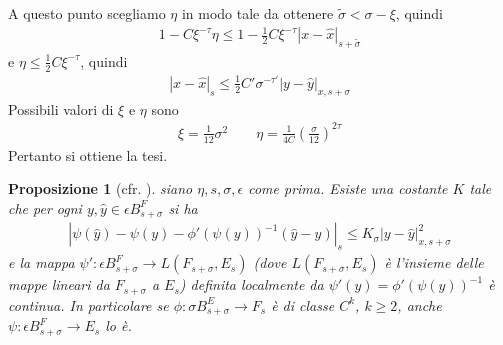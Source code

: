 \documentclass[twoside, 11pt]{amsbook}
\makeatletter
\newcommand{\0}{{(0)}}
\newcommand{\3}{{(3)}}
\theoremstyle{colonplain}
\newtheorem{prop}[thm]{Proposizione}
\theoremstyle{colondefinition}
\theoremstyle{colonremark}
\numberwithin{equation}{chapter}
\renewcommand{\proofname}{Dimostrazione}
\renewenvironment{proof}[1][\proofname]{\par
  \pushQED{\qed}%
  \normalfont \topsep6\p@\@plus6\p@\relax
  \trivlist
  \item[\hskip\labelsep\bfseries #1:]\ignorespaces
}{%
  \popQED\endtrivlist\@endpefalse
}
\makeatother
\begin{document}
\begin{proof}
A questo punto scegliamo $\eta$ in modo tale da ottenere $\widetilde{\sigma} < \sigma - \xi$, quindi
\begin{align}
    1 - C\xi^{-\tau}\eta \leq 1 - \frac{1}{2}C\xi^{-\tau}|x - \hat{x}|_{s + \widetilde{\sigma}}
\end{align}
e $\eta \leq \frac{1}{2}C\xi^{-\tau}$, quindi
\begin{align}
    |x - \hat{x}|_s \leq \frac{1}{2}C'\sigma^{-\tau'}|y - \hat{y}|_{x, s + \sigma}
\end{align}
Possibili valori di $\xi$ e $\eta$ sono
\begin{align}
    \xi = \frac{1}{12}\sigma^2 \qquad \eta = \frac{1}{4C}\left(\frac{\sigma}{12}\right)^{2\tau}
\end{align}
Pertanto si ottiene la tesi.
\end{proof}
\begin{prop}[cfr. \cite{Massetti}]\label{PsiC^1} siano $\eta, s, \sigma, \epsilon$ come prima. Esiste una costante $K$ tale che per ogni $y, \hat{y} \in \epsilon B^F_{s + \sigma}$ si ha
\begin{align}
    |\psi(\hat{y}) - \psi(y) - \phi'(\psi(y))^{-1}(\hat{y} - y)|_s \leq K_\sigma|y - \hat{y}|^2_{x, s + \sigma}
\end{align}
e la mappa $\psi' : \epsilon B^F_{s + \sigma} \longrightarrow L(F_{s + \sigma}, E_s)$ (dove $L(F_{s + \sigma}, E_s)$ è l'insieme delle mappe lineari da $F_{s + \sigma}$ a $E_s$) definita localmente da $\psi'(y) = \phi'(\psi(y))^{-1}$ è continua. In particolare se $\phi : \sigma B^E_{s + \sigma} \longrightarrow F_s$ è di classe $C^k$, $k \geq 2$, anche $\psi : \epsilon B^F_{s + \sigma} \longrightarrow E_s$ lo è.
\end{prop}
\end{document}
